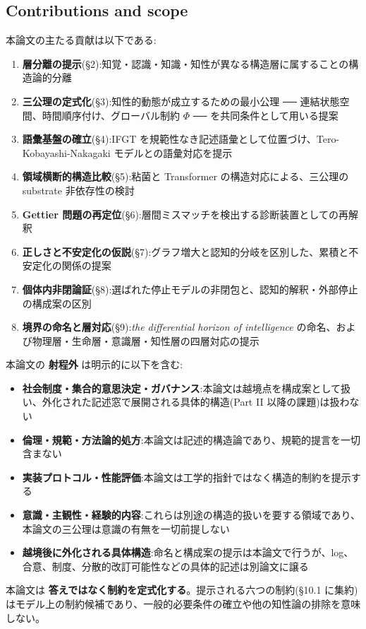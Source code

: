 \subsection{Contributions and scope}


本論文の主たる貢献は以下である:

\begin{enumerate}
\item \textbf{層分離の提示}(\S{}2):知覚・認識・知識・知性が異なる構造層に属することの構造論的分離
\item \textbf{三公理の定式化}(\S{}3):知性的動態が成立するための最小公理 ── 連結状態空間、時間順序付け、グローバル制約 $\Phi$ ── を共同条件として用いる提案
\item \textbf{語彙基盤の確立}(\S{}4):IFGT を規範性なき記述語彙として位置づけ、Tero-Kobayashi-Nakagaki モデルとの語彙対応を提示
\item \textbf{領域横断的構造比較}(\S{}5):粘菌と Transformer の構造対応による、三公理の substrate 非依存性の検討
\item \textbf{Gettier 問題の再定位}(\S{}6):層間ミスマッチを検出する診断装置としての再解釈
\item \textbf{正しさと不安定化の仮説}(\S{}7):グラフ増大と認知的分岐を区別した、累積と不安定化の関係の提案
\item \textbf{個体内非閉論証}(\S{}8):選ばれた停止モデルの非閉包と、認知的解釈・外部停止の構成案の区別
\item \textbf{境界の命名と層対応}(\S{}9):\emph{the differential horizon of intelligence} の命名、および物理層・生命層・意識層・知性層の四層対応の提示
\end{enumerate}

本論文の \textbf{射程外} は明示的に以下を含む:

\begin{itemize}
\item \textbf{社会制度・集合的意思決定・ガバナンス}:本論文は越境点を構成案として扱い、外化された記述窓で展開される具体的構造(Part II 以降の課題)は扱わない
\item \textbf{倫理・規範・方法論的処方}:本論文は記述的構造論であり、規範的提言を一切含まない
\item \textbf{実装プロトコル・性能評価}:本論文は工学的指針ではなく構造的制約を提示する
\item \textbf{意識・主観性・経験的内容}:これらは別途の構造的扱いを要する領域であり、本論文の三公理は意識の有無を一切前提しない
\item \textbf{越境後に外化される具体構造}:命名と構成案の提示は本論文で行うが、log、合意、制度、分散的改訂可能性などの具体的記述は別論文に譲る
\end{itemize}

本論文は \textbf{答えではなく制約を定式化する}。提示される六つの制約(\S{}10.1 に集約)はモデル上の制約候補であり、一般的必要条件の確立や他の知性論の排除を意味しない。
